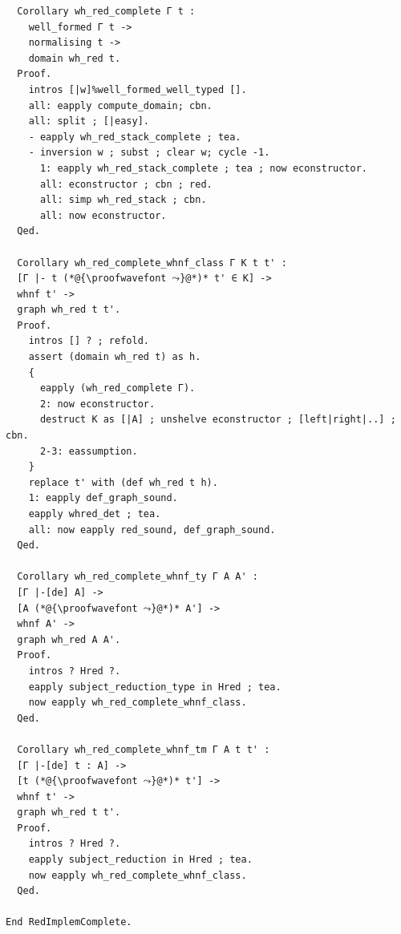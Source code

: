 \begin{lstlisting}
  Corollary wh_red_complete Γ t :
    well_formed Γ t ->
    normalising t ->
    domain wh_red t.
  Proof.
    intros [|w]%well_formed_well_typed [].
    all: eapply compute_domain; cbn.
    all: split ; [|easy].
    - eapply wh_red_stack_complete ; tea.
    - inversion w ; subst ; clear w; cycle -1.
      1: eapply wh_red_stack_complete ; tea ; now econstructor.
      all: econstructor ; cbn ; red.
      all: simp wh_red_stack ; cbn.
      all: now econstructor.
  Qed.

  Corollary wh_red_complete_whnf_class Γ K t t' :
  [Γ |- t (*@{\proofwavefont ⤳}@*)* t' ∈ K] ->
  whnf t' ->
  graph wh_red t t'.
  Proof.
    intros [] ? ; refold.
    assert (domain wh_red t) as h.
    {
      eapply (wh_red_complete Γ).
      2: now econstructor.
      destruct K as [|A] ; unshelve econstructor ; [left|right|..] ; cbn.
      2-3: eassumption.
    }
    replace t' with (def wh_red t h).
    1: eapply def_graph_sound.
    eapply whred_det ; tea.
    all: now eapply red_sound, def_graph_sound.
  Qed.
  
  Corollary wh_red_complete_whnf_ty Γ A A' :
  [Γ |-[de] A] ->
  [A (*@{\proofwavefont ⤳}@*)* A'] ->
  whnf A' ->
  graph wh_red A A'.
  Proof.
    intros ? Hred ?.
    eapply subject_reduction_type in Hred ; tea.
    now eapply wh_red_complete_whnf_class.
  Qed.
  
  Corollary wh_red_complete_whnf_tm Γ A t t' :
  [Γ |-[de] t : A] ->
  [t (*@{\proofwavefont ⤳}@*)* t'] ->
  whnf t' ->
  graph wh_red t t'.
  Proof.
    intros ? Hred ?.
    eapply subject_reduction in Hred ; tea.
    now eapply wh_red_complete_whnf_class.
  Qed.

End RedImplemComplete.
\end{lstlisting}

